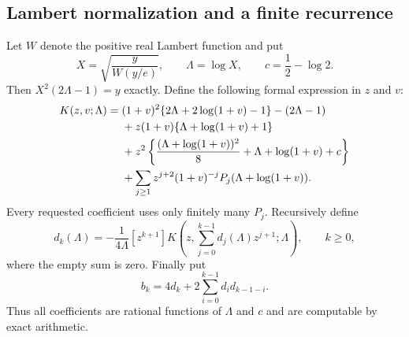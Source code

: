 \documentclass[11pt,letterpaper]{article}
\numberwithin{equation}{section}
\begin{document}
\subsection{Lambert normalization and a finite recurrence}
Let $W$ denote the positive real Lambert function and put
\begin{equation}\label{sma:eq:Lambert}
 X=\sqrt{\frac{y}{W(y/e)}},\qquad \Lambda=\log X,\qquad c=\frac12-\log2.
\end{equation}
Then $X^2(2\Lambda-1)=y$ exactly. Define the following formal expression in $z$ and $v$:
\begin{align}
 K(z,v;\Lambda)={}&(1+v)^2\{2\Lambda+2\log(1+v)-1\}-(2\Lambda-1)\notag\\
 &+z(1+v)\{\Lambda+\log(1+v)+1\}\notag\\
 &+z^2\left\{\frac{(\Lambda+\log(1+v))^2}{8}
                  +\Lambda+\log(1+v)+c\right\}\label{sma:eq:K}\\
 &+\sum_{j\ge1}z^{j+2}(1+v)^{-j}P_j(\Lambda+\log(1+v)).\notag
\end{align}
Every requested coefficient uses only finitely many $P_j$. Recursively define
\begin{equation}\label{sma:eq:drec}
 d_k(\Lambda)=-\frac1{4\Lambda}[z^{k+1}]
 K\left(z,\sum_{j=0}^{k-1}d_j(\Lambda)z^{j+1};\Lambda\right),\qquad k\ge0,
\end{equation}
where the empty sum is zero. Finally put
\begin{equation}\label{sma:eq:brec}
 b_k=4d_k+2\sum_{i=0}^{k-1}d_i d_{k-1-i}.
\end{equation}
Thus all coefficients are rational functions of $\Lambda$ and $c$ and are computable by exact arithmetic.
\end{document}
